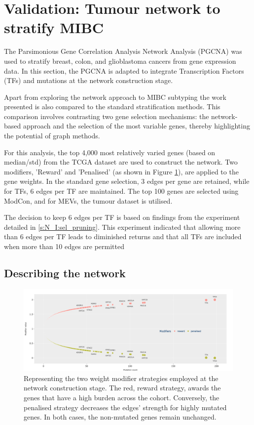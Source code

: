 


\section{Validation: Tumour network to stratify MIBC} \label{s:N_I:tum}


The Parsimonious Gene Correlation Analysis Network Analysis (PGCNA) was used to stratify breast, colon, and glioblastoma cancers \cite{Care2019-ij,Tanner2023-wa} from gene expression data. In this section, the PGCNA is adapted to integrate Transcription Factors (TFs) and mutations at the network construction stage. 

Apart from exploring the network approach to MIBC subtyping the work presented is also compared to the standard stratification methods. This comparison involves contrasting two gene selection mechanisms: the network-based approach and the selection of the most variable genes, thereby highlighting the potential of graph methods.

For this analysis, the top 4,000 most relatively varied genes (based on median/std) from the TCGA dataset are used to construct the network. Two modifiers, 'Reward' and 'Penalised' (as shown in Figure \ref{fig:N_I:modifiers}), are applied to the gene weights. In the standard gene selection, 3 edges per gene are retained, while for TFs, 6 edges per TF are maintained. The top 100 genes are selected using ModCon, and for MEVs, the tumour dataset is utilised.

The decision to keep 6 edges per TF is based on findings from the experiment detailed in \cref{s:N_I:sel_pruning}. This experiment indicated that allowing more than 6 edges per TF leads to diminished returns and that all TFs are included when more than 10 edges are permitted

\subsection{Describing the network} \label{s:N_I:tum_describe}

\begin{figure}[!htb]    \centering\includegraphics[width=1.0\textwidth,keepaspectratio]{Sections/Network_I/Resources/Methods/modifiers.png}
    \caption{Representing the two weight modifier strategies employed at the network construction stage. The red, reward strategy, awards the genes that have a high burden across the cohort. Conversely, the  penalised strategy decreases the edges' strength for highly mutated genes. In both cases, the non-mutated genes remain unchanged.}
    \label{fig:N_I:modifiers}
\end{figure}

